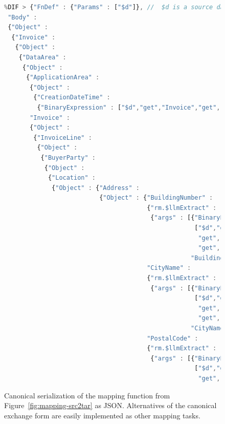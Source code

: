 \documentclass[10pt,letterpaper]{article} %
\providecommand{\DIFmodbegin}{} %
\begin{document}
\begin{figure}[H]
  \caption{Canonical serialization of the mapping function from Figure~\ref{fig:mapping-src2tar} as JSON.
    Alternatives of the canonical exchange form are easily implemented as other mapping tasks.}
 \label{fig:mapping-src2tar-toAST}
\DIFmodbegin
\begin{lstlisting}[language=JavaScript,basicstyle=\ttfamily\scriptsize,numberstyle=\scriptsize,alsolanguage=DIFcode]
%DIF < {"FnDef" : {"Params" : ["$d"]}, //  $d is a source data structure
%DIF > {"FnDef" : {"Params" : ["$d"]}, //  $d is a source data structure.
 "Body" :
 {"Object" :
  {"Invoice" :
   {"Object" :
    {"DataArea" :
     {"Object" :
      {"ApplicationArea" :
       {"Object" :
        {"CreationDateTime" :
         {"BinaryExpression" : ["$d","get","Invoice","get","ApplicationArea","get","CreationDateTime"]}}},
       "Invoice" :
       {"Object" :
        {"InvoiceLine" :
         {"Object" :
          {"BuyerParty" :
           {"Object" :
            {"Location" :
             {"Object" : {"Address" :
                          {"Object" : {"BuildingNumber" :
                                       {"rm.$llmExtract" :
                                        {"args" : [{"BinaryExpression" :
                                                    ["$d","get","Invoice","get","DataArea","get","Invoice",
                                                     "get","InvoiceLine","get","BuyerParty","get","Location",
                                                     "get","Address","get","AddressLine"]},
                                                   "BuildingNumber"]}},
                                       "CityName" :
                                       {"rm.$llmExtract" :
                                        {"args" : [{"BinaryExpression" :
                                                    ["$d","get","Invoice","get","DataArea","get","Invoice",
                                                     "get","InvoiceLine","get","BuyerParty","get","Location",
                                                     "get","Address","get","AddressLine"]},
                                                   "CityName"]}},
                                       "PostalCode" :
                                       {"rm.$llmExtract" :
                                        {"args" : [{"BinaryExpression" :
                                                    ["$d","get","Invoice","get","DataArea","get","Invoice",
                                                     "get","InvoiceLine","get","BuyerParty","get","Location",

\end{lstlisting}
\end{figure}
\end{document}
